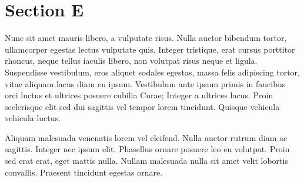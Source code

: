\section{Section E}
Nunc sit amet mauris libero, a vulputate risus. Nulla auctor bibendum tortor, ullamcorper egestas lectus vulputate quis. Integer tristique, erat cursus porttitor rhoncus, neque tellus iaculis libero, non volutpat risus neque et ligula. Suspendisse vestibulum, eros aliquet sodales egestas, massa felis adipiscing tortor, vitae aliquam lacus diam eu ipsum. Vestibulum ante ipsum primis in faucibus orci luctus et ultrices posuere cubilia Curae; Integer a ultrices lacus. Proin scelerisque elit sed dui sagittis vel tempor lorem tincidunt. Quisque vehicula vehicula luctus.

Aliquam malesuada venenatis lorem vel eleifend. Nulla auctor rutrum diam ac sagittis. Integer nec ipsum elit. Phasellus ornare posuere leo eu volutpat. Proin sed erat erat, eget mattis nulla. Nullam malesuada nulla sit amet velit lobortis convallis. Praesent tincidunt egestas ornare.
